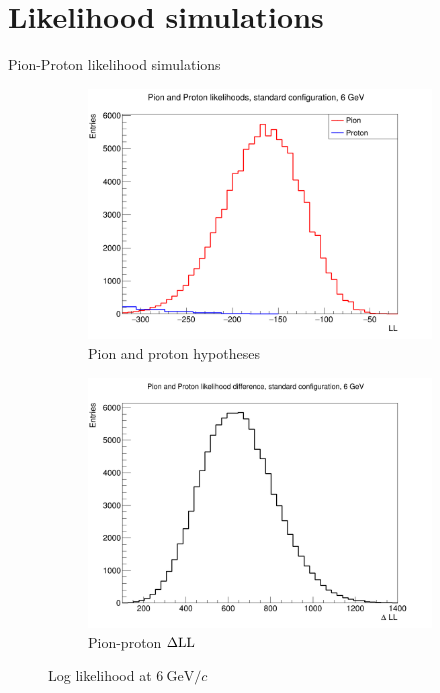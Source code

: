 \documentclass{beamer}
\begin{document}
\section{Likelihood simulations}
\begin{frame}{Pion-Proton likelihood simulations}
  \begin{figure}
    \centering
    \vspace{-0.2cm}
    \begin{subfigure}{0.5\textwidth}
      \includegraphics[width = 1.0\textwidth]{Plots/ProtonPionLL6GeVStandard.png}
      \caption{Pion and proton hypotheses}
    \end{subfigure}%
    \begin{subfigure}{0.5\textwidth}
      \includegraphics[width = 1.0\textwidth]{Plots/ProtonPionDLL6GeVStandard.png}
      \caption{Pion-proton $\Delta{\rm LL}$}
    \end{subfigure}
    \caption{Log likelihood at $\SI{6}{\giga\eV/c}$}
  \end{figure}
\end{frame}
\end{document}
